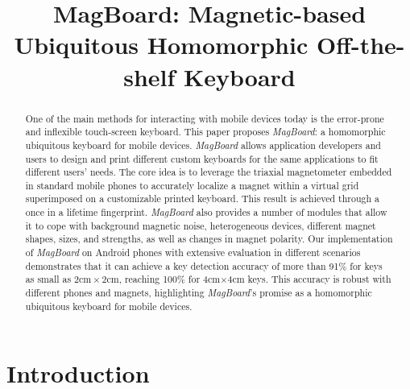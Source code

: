 \documentclass[conference]{IEEEtran}
\def \sys {\textit{MagBoard}}
\begin{document}
\author{
\and
{}
\and
{}
}

\title{MagBoard: Magnetic-based Ubiquitous Homomorphic Off-the-shelf Keyboard}

\maketitle

\begin{abstract}

One of the main methods for interacting with mobile devices today is the error-prone and inflexible touch-screen keyboard. This paper proposes \sys{}: a homomorphic ubiquitous keyboard for mobile devices. \sys{} allows application developers and users to design and print different custom keyboards for the same applications to fit different users' needs. 
The core idea is to leverage the triaxial magnetometer embedded in standard mobile phones to accurately localize a magnet within a virtual grid superimposed on a customizable printed keyboard. This result is achieved through a once in a lifetime fingerprint. \sys{} also provides a number of modules that allow it to cope with background magnetic noise, heterogeneous devices, different magnet shapes, sizes, and strengths, as well as changes in magnet polarity. Our implementation of \sys{} on Android phones with extensive evaluation in different scenarios demonstrates that it can achieve a key detection accuracy of more than 91\% for keys as small as $2\textrm{cm}\times2\textrm{cm}$, reaching 100\% for  4cm$\times$4cm keys. This accuracy is robust with different phones and magnets, highlighting \sys{}'s promise as a homomorphic ubiquitous keyboard for mobile devices.

\end{abstract}

\section{Introduction}
\end{document}
